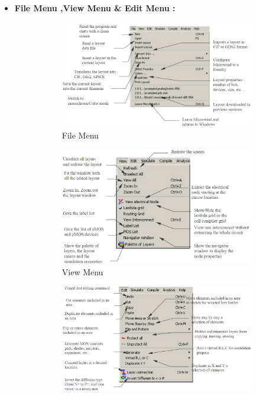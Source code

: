 \documentclass[a4paper,12pt]{article}
\begin{document}
	\begin{itemize}
		\item \textbf{File Menu ,View Menu \& Edit Menu :}
		\begin{figure}[H]
			\centering
			\begin{subfigure}[t]{0.49\textwidth}
				\centering
				\includegraphics[width=1\textwidth , height=.24\textheight]{Images/microwind/filemenu.png}
				\caption{File Menu}
				\label{fig:3-a}
			\end{subfigure}
			\hfill
			\begin{subfigure}[t]{0.49\textwidth}
				\centering
				\includegraphics[width=1\textwidth , height=.24\textheight]{Images/microwind/viewmenu.png}
				\caption{View Menu}
				\label{fig:3-b}
			\end{subfigure}
			\begin{subfigure}[t]{0.49\textwidth}
				\centering
				\includegraphics[width=1\textwidth , height=.24\textheight]{Images/microwind/editmenu.png}

\end{subfigure}
\end{figure}
\end{itemize}
\end{document}
